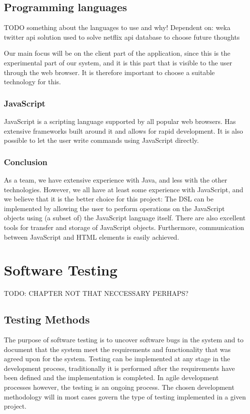 \subsection{Programming languages}
TODO something about the languages to use and why!
Dependent on:
    weka
    twitter api
    solution used to solve netflix api
    database to choose
    future thoughts


Our main focus will be on the client part of the application, since this is the experimental part of our system, and it is this part that is visible to the user through the web browser. It is therefore important to choose a suitable technology for this.


\subsubsection{JavaScript}

JavaScript is a scripting language supported by all popular web browsers. Has extensive frameworks built around it and allows for rapid development. It is also possible to let the user write commands using JavaScript directly.

\subsubsection{Conclusion}
As a team, we have extensive experience with Java, and less with the other technologies. However, we all have at least some experience with JavaScript, and we believe that it is the better choice for this project: The DSL can be implemented by allowing the user to perform operations on the JavaScript objects using (a subset of) the JavaScript language itself. There are also excellent tools for transfer and storage of JavaScript objects. Furthermore, communication between JavaScript and HTML elements is easily achieved.






\section{Software Testing}
TODO: CHAPTER NOT THAT NECCESSARY PERHAPS?

\subsection{Testing Methods}
The purpose of software testing is to uncover software bugs in the system and to document that the system meet the requirements and functionality that was agreed upon for the system. Testing can be implemented at any stage in the development process, traditionally it is performed after the requirements have been defined and the implementation is completed. In agile development processes however, the testing is an ongoing process. The chosen development methodology will in most cases govern the type of testing implemented in a given project.
\cite{sommerville2011software}

